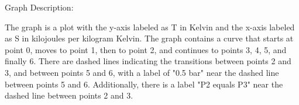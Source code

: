 Graph Description:

The graph is a plot with the y-axis labeled as T in Kelvin and the x-axis labeled as S in kilojoules per kilogram Kelvin. The graph contains a curve that starts at point 0, moves to point 1, then to point 2, and continues to points 3, 4, 5, and finally 6. There are dashed lines indicating the transitions between points 2 and 3, and between points 5 and 6, with a label of "0.5 bar" near the dashed line between points 5 and 6. Additionally, there is a label "P2 equals P3" near the dashed line between points 2 and 3.